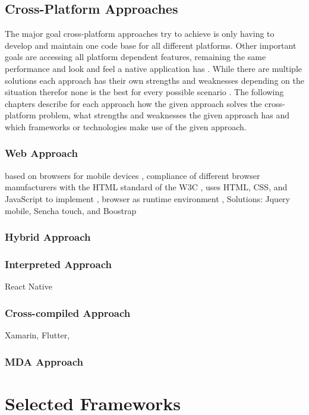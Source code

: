 \documentclass[Bachelor,BIF,english]{twbook}
\begin{document}
\section{Cross-Platform Approaches}
The major goal cross-platform approaches try to achieve is only having to develop and maintain one code base for all different platforms. Other important goals are accessing all platform dependent features, remaining the same performance and look and feel a native application has \cite[p.~1]{7479278} \cite[p.~1]{7934674}. While there are multiple solutions each approach has their own strengths and weaknesses depending on the situation therefor none is the best for every possible scenario \cite[p.~110]{Keist2016}. The following chapters describe for each approach how the given approach solves the cross-platform problem, what strengths and weaknesses the given approach has and which frameworks or technologies make use of the given approach.

\subsection{Web Approach}
based on browsers for mobile devices \cite[p.~2]{7934674}, compliance of different browser manufacturers with the HTML standard of the W3C \cite[p.~2]{LinckArne2016}, uses HTML, CSS, and JavaScript to implement \cite[p.~2]{7934674}, browser as runtime environment \cite{7934674}, Solutions: Jquery mobile, Sencha touch, and Boostrap \cite{7934674}

\subsection{Hybrid Approach}

\subsection{Interpreted Approach}
React Native

\subsection{Cross-compiled Approach}
Xamarin, Flutter,

\subsection{MDA Approach}


\chapter{Selected Frameworks}
\end{document}
